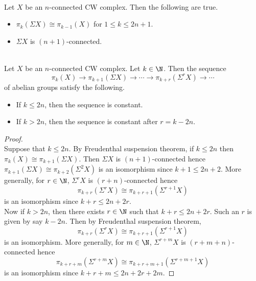 \documentclass[a4paper]{article}
\begin{document}
\begin{crl}{}{}\\
Let $X$ be an $n$-connected CW complex. Then the following are true. 
\begin{itemize}
\item $\pi_k(\Sigma X)\cong\pi_{k-1}(X)$ for $1\leq k\leq 2n+1$. 
\item $\Sigma X$ is $(n+1)$-connected. 
\end{itemize}
\end{crl}

\begin{crl}{}{}\\
Let $X$ be an $n$-connected CW complex. Let $k\in\N$. Then the sequence $$\pi_k(X)\to\pi_{k+1}(\Sigma X)\to\cdots\to\pi_{k+r}(\Sigma^r X)\to\cdots$$ of abelian groups satisfy the following. 
\begin{itemize}
\item If $k\leq 2n$, then the sequence is constant. 
\item If $k>2n$, then the sequence is constant after $r=k-2n$. 
\end{itemize}
\begin{proof}\\
Suppose that $k\leq 2n$. By Freudenthal suspension theorem, if $k\leq 2n$ then $\pi_k(X)\cong\pi_{k+1}(\Sigma X)$. Then $\Sigma X$ is $(n+1)$-connected hence $\pi_{k+1}(\Sigma X)\cong\pi_{k+2}(\Sigma^2X)$ is an isomorphism since $k+1\leq 2n+2$. More generally, for $r\in\N$, $\Sigma^rX$ is $(r+n)$-connected hence $$\pi_{k+r}(\Sigma^rX)\cong\pi_{k+r+1}(\Sigma^{r+1}X)$$ is an isomorphism since $k+r\leq 2n+2r$. \\

Now if $k>2n$, then there exists $r\in\N$ such that $k+r\leq 2n+2r$. Such an $r$ is given by say $k-2n$. Then by Freudenthal suspension theorem, $$\pi_{k+r}(\Sigma^rX)\cong\pi_{k+r+1}(\Sigma^{r+1}X)$$ is an isomorphism. More generally, for $m\in\N$, $\Sigma^{r+m}X$ is $(r+m+n)$-connected hence $$\pi_{k+r+m}(\Sigma^{r+m}X)\cong\pi_{k+r+m+1}(\Sigma^{r+m+1}X)$$ is an isomorphism since $k+r+m\leq 2n+2r+2m$. 
\end{proof}
\end{crl}
\end{document}
